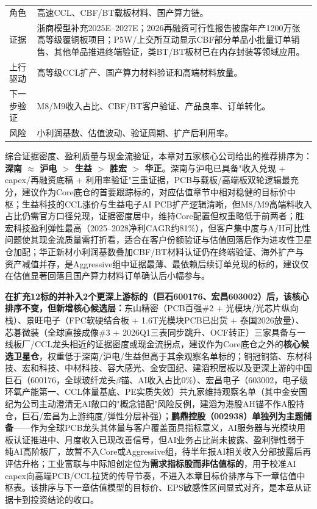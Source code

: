 \begin{exhibitbox}
\small
\begin{tabularx}{\textwidth}{L{2.6cm}X}
\toprule
角色 & 高速CCL、CBF/BT载板材料、国产算力链。 \\
证据 & 浙商模型补充2025E--2027E；2026再融资可行性报告披露年产1200万张高等级覆铜板项目；P5W/上交所互动显示CBF部分单品小批量订单销售、其他单品推进终端验证，类BT/BT板材已在内存封装等领域应用。 \\
上行驱动 & 高等级CCL扩产、国产算力材料验证和高端材料放量。 \\
下一步验证 & M8/M9收入占比、CBF/BT客户验证、产品良率、订单转化。 \\
风险 & 小利润基数、估值波动、验证周期、扩产后利用率。 \\
\bottomrule
\end{tabularx}
\end{exhibitbox}

综合证据密度、盈利质量与现金流验证，本章对五家核心公司给出的推荐排序为：\textbf{深南 $\approx$ 沪电 $>$ 生益 $>$ 胜宏 $>$ 华正}。深南与沪电已具备"收入兑现 + capex/再融资底稿 + 利用率验证"三重证据，PCB与载板/高端板双轮逻辑最充分，建议作为Core底仓的首要跟踪标的，对应估值章节中相对稳健的目标价中枢；生益科技的CCL涨价与生益电子AI PCB扩产逻辑清晰，但M8/M9高端料收入占比仍需官方口径兑现，证据密度居中，维持Core配置但权重略低于前两者；胜宏科技盈利弹性最高（2025--2028净利CAGR约81\%），但客户集中度与A/H可比性问题使其现金流质量需打折看，适合在客户份额验证与估值回落后作为进攻性卫星仓加配；华正新材小利润基数叠加CBF/BT材料认证仍在终端验证、海外扩产与资产减值并存，是Aggressive组中证据最薄、最依赖后续订单兑现的标的，建议仅在估值显著回落且国产算力材料订单确认后小幅参与。

\textbf{在扩充12标的并补入2个更深上游标的（巨石600176、宏昌603002）后，该核心排序不变，但新增核心候选层：}东山精密（PCB百强\#2 + 光模块/光芯片纵向栈）、景旺电子（FPC软硬结合板 + 1.6T光模块PCB已出货 + 泰国2026放量）、芯碁微装（全球直接成像\#3 + 2026Q1三表同步跳升、OCF转正）三家具备与一线板厂/CCL龙头相近的证据密度或现金流拐点，建议作为Core底仓之外的\textbf{核心候选卫星仓}，权重低于深南/沪电/生益但高于其余观察名单标的；铜冠铜箔、东材科技、宏和科技、中材科技、容大感光、金安国纪、建滔积层板以及更深上游的中国巨石（600176，全球玻纤龙头$\beta$锚、AI收入占比0\%）、宏昌电子（603002，电子级环氧产能第一、CCL体量基底、PE实质失效）共九家维持观察名单（其中金安国纪为公司主动澄清无AI敞口的"概念错配"风险反例，建滔为港股AH锚不作A股持仓，巨石/宏昌为上游纯度/弹性分层补强）；\textbf{鹏鼎控股（002938）单独列为主题储备}——作为全球PCB龙头其体量与客户覆盖面具指标意义，AI服务器与光模块用板认证推进中、月度收入已现改善信号，但AI业务占比尚未披露、盈利弹性弱于纯AI高阶板厂，故暂不入Core或Aggressive组，待半年报AI相关收入分部披露后再评估升格；工业富联与中际旭创定位为\textbf{需求指标股而非估值标的}，用于校准AI capex向高端PCB/CCL拉货的传导节奏，不进入本章目标价排序与下一章估值中枢表。该排序与下一章估值模型的目标价、EPS敏感性区间显式对齐，是本章从证据卡到投资结论的收口。

